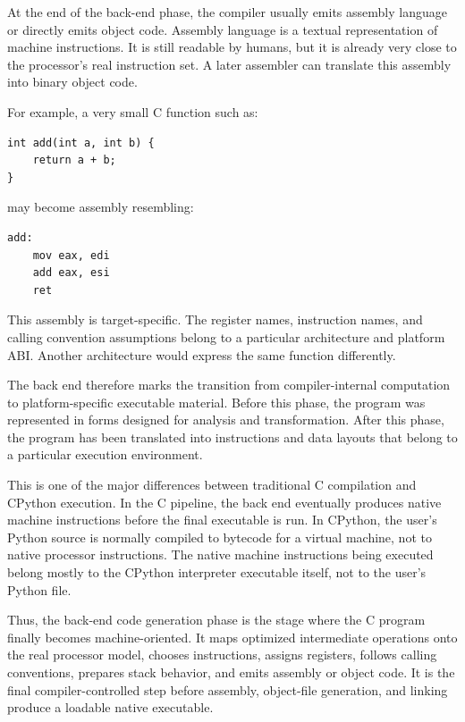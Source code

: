 At the end of the back-end phase, the compiler usually emits assembly language or directly emits object code. Assembly language is a textual representation of machine instructions. It is still readable by humans, but it is already very close to the processor's real instruction set. A later assembler can translate this assembly into binary object code.

For example, a very small C function such as:

\begin{verbatim}
int add(int a, int b) {
    return a + b;
}
\end{verbatim}

may become assembly resembling:

\begin{verbatim}
add:
    mov eax, edi
    add eax, esi
    ret
\end{verbatim}

This assembly is target-specific. The register names, instruction names, and calling convention assumptions belong to a particular architecture and platform ABI. Another architecture would express the same function differently.

The back end therefore marks the transition from compiler-internal computation to platform-specific executable material. Before this phase, the program was represented in forms designed for analysis and transformation. After this phase, the program has been translated into instructions and data layouts that belong to a particular execution environment.

This is one of the major differences between traditional C compilation and CPython execution. In the C pipeline, the back end eventually produces native machine instructions before the final executable is run. In CPython, the user's Python source is normally compiled to bytecode for a virtual machine, not to native processor instructions. The native machine instructions being executed belong mostly to the CPython interpreter executable itself, not to the user's Python file.

Thus, the back-end code generation phase is the stage where the C program finally becomes machine-oriented. It maps optimized intermediate operations onto the real processor model, chooses instructions, assigns registers, follows calling conventions, prepares stack behavior, and emits assembly or object code. It is the final compiler-controlled step before assembly, object-file generation, and linking produce a loadable native executable.




